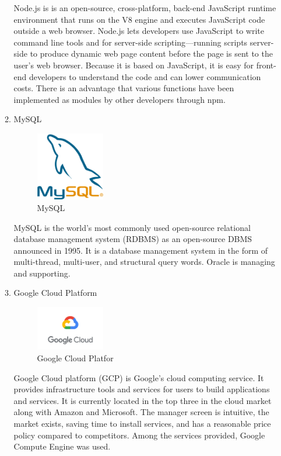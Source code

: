 \documentclass[conference]{IEEEtran}
\begin{document}
\begin{itemize}
\begin{enumerate}
Node.js is is an open-source, cross-platform, back-end JavaScript runtime environment that runs on the V8 engine and executes JavaScript code outside a web browser. Node.js lets developers use JavaScript to write command line tools and for server-side scripting—running scripts server-side to produce dynamic web page content before the page is sent to the user's web browser. Because it is based on JavaScript, it is easy for front-end developers to understand the code and can lower communication costs. There is an advantage that various functions have been implemented as modules by other developers through npm.

\item MySQL
\par \begin{figure}[h!]
\includegraphics[width=3cm]{image/MySQL.png}
\centering
\caption{MySQL}
\end{figure}

MySQL is the world's most commonly used open-source relational database management system (RDBMS) as an open-source DBMS announced in 1995. It is a database management system in the form of multi-thread, multi-user, and structural query words. Oracle is managing and supporting.

\item Google Cloud Platform
\par \begin{figure}[h!]
\includegraphics[width=3cm]{image/GCP.png}
\centering
\caption{Google Cloud Platfor}
\end{figure}

Google Cloud platform (GCP) is Google's cloud computing service. It provides infrastructure tools and services for users to build applications and services. It is currently located in the top three in the cloud market along with Amazon and Microsoft. The manager screen is intuitive, the market exists, saving time to install services, and has a reasonable price policy compared to competitors. Among the services provided, Google Compute Engine was used.


\end{enumerate}
\end{itemize}
\end{document}
